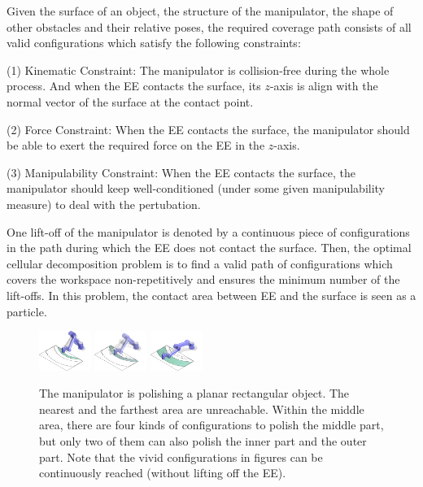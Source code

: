 \documentclass[journal]{IEEEtran}
\begin{document}
Given the surface of an object, the structure of the  manipulator, the shape of other obstacles and their relative poses, the required coverage path consists of all valid configurations which satisfy the following constraints:

(1) Kinematic Constraint: The manipulator is collision-free during the whole process. And when the EE contacts the surface, its $z$-axis is align with the normal vector of the surface at the contact point. 

(2) Force Constraint: When the EE contacts the surface, the manipulator should be able to exert the required force on the EE in the $z$-axis.  

(3) Manipulability Constraint: When the EE contacts the surface, the manipulator should keep well-conditioned (under some given  manipulability measure) to deal with the pertubation.

\noindent
One lift-off of the manipulator is denoted by a continuous piece of configurations in the path during which the EE does not contact the surface.
Then, the optimal cellular decomposition problem is to find a valid path of configurations which covers the workspace non-repetitively and ensures the minimum number of the lift-offs.
In this problem, the contact area between EE and the surface is seen as a particle.

\begin{figure}[t]
\centering
\includegraphics[width = 0.15\textwidth]{square_example/simple_example_merged_545}
\includegraphics[width = 0.15\textwidth]{square_example/simple_example_merged_551}
\includegraphics[width = 0.15\textwidth]{square_example/simple_example_merged_565}
\caption{The manipulator is polishing a planar rectangular object. The nearest and the farthest area are unreachable. Within the middle area, there are four kinds of configurations to polish the middle part, but only two of them can also polish the inner part and the outer part. Note that the vivid configurations in figures can be continuously reached (without lifting off the EE).}\label{figsquare}
\end{figure}
\end{document}
